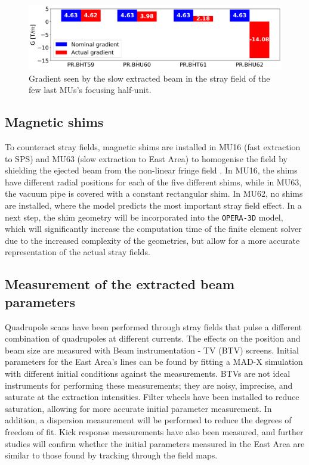 \documentclass[a4paper,
               biblatex,     %
               keeplastbox,   %
               ]{jacow}
\begin{document}
\begin{figure}[!htb]
   \centering
   \includegraphics*[width=1.0\columnwidth]{gradient_focusing_poster.png}
   \caption{Gradient seen by the slow extracted beam in the stray field of the few last MUs's focusing half-unit.}
   \label{fig:stray field gradients}
\end{figure}

\subsection{Magnetic shims}

To counteract stray fields, magnetic shims are installed in MU16 (fast extraction to SPS) and MU63 (slow extraction to East Area) to homogenise the field by shielding the ejected beam from the non-linear fringe field \cite{zickler_influence_nodate}. In MU16, the shims have different radial positions for each of the five different shims, while in MU63, the vacuum pipe is covered with a constant rectangular shim. In MU62, no shims are installed, where the model predicts the most important stray field effect. In a next step, the shim geometry will be incorporated into the \texttt{OPERA-3D} model, which will significantly increase the computation time of the finite element solver due to the increased complexity of the geometries, but allow for a more accurate representation of the actual stray fields.

\subsection{Measurement of the extracted beam parameters}

Quadrupole scans have been performed through stray fields that pulse a different combination of quadrupoles at different currents. The effects on the position and beam size are measured with Beam instrumentation - TV (BTV) screens. Initial parameters for the East Area's lines can be found by fitting a MAD-X simulation with different initial conditions against the measurements. BTVs are not ideal instruments for performing these measurements; they are noisy, imprecise, and saturate at the extraction intensities. Filter wheels have been installed to reduce saturation, allowing for more accurate initial parameter measurement. In addition, a dispersion measurement will be performed to reduce the degrees of freedom of fit.
Kick response measurements have also been measured, and further studies will confirm whether the initial parameters measured in the East Area are similar to those found by tracking through the field maps.
\end{document}
